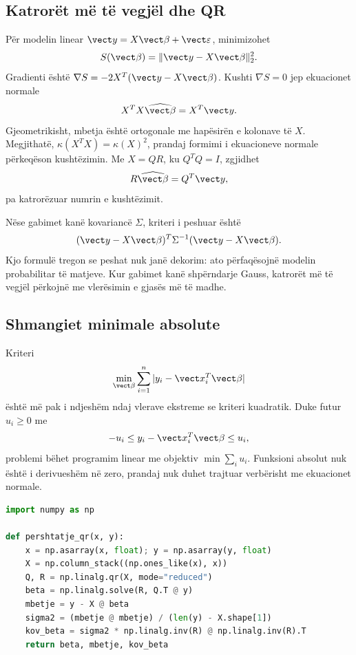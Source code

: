 \subsection{Katrorët më të vegjël dhe QR}
Për modelin linear $\vect y=X\vect\beta+\vect\varepsilon$, minimizohet
\begin{equation}
 S(\vect\beta)=\|\vect y-X\vect\beta\|_2^2.
\end{equation}
Gradienti është $\nabla S=-2X^T(\vect y-X\vect\beta)$. Kushti $\nabla S=0$ jep ekuacionet normale
\begin{equation}
 X^TX\widehat{\vect\beta}=X^T\vect y.
\end{equation}
Gjeometrikisht, mbetja është ortogonale me hapësirën e kolonave të $X$. Megjithatë, $\kappa(X^TX)=\kappa(X)^2$, prandaj formimi i ekuacioneve normale përkeqëson kushtëzimin. Me $X=QR$, ku $Q^TQ=I$, zgjidhet
\begin{equation}
 R\widehat{\vect\beta}=Q^T\vect y,
\end{equation}
pa katrorëzuar numrin e kushtëzimit.

Nëse gabimet kanë kovariancë $\Sigma$, kriteri i peshuar është
\begin{equation}
 (\vect y-X\vect\beta)^T\Sigma^{-1}(\vect y-X\vect\beta).
\end{equation}
Kjo formulë tregon se peshat nuk janë dekorim: ato përfaqësojnë modelin probabilitar të matjeve. Kur gabimet kanë shpërndarje Gauss, katrorët më të vegjël përkojnë me vlerësimin e gjasës më të madhe.

\subsection{Shmangiet minimale absolute}
Kriteri
\begin{equation}
 \min_{\vect\beta}\sum_{i=1}^{n}|y_i-\vect x_i^T\vect\beta|
\end{equation}
është më pak i ndjeshëm ndaj vlerave ekstreme se kriteri kuadratik. Duke futur $u_i\ge0$ me
\begin{equation}
 -u_i\le y_i-\vect x_i^T\vect\beta\le u_i,
\end{equation}
problemi bëhet programim linear me objektiv $\min\sum_i u_i$. Funksioni absolut nuk është i derivueshëm në zero, prandaj nuk duhet trajtuar verbërisht me ekuacionet normale.

\begin{lstlisting}[language=Python,caption={Përshtatje lineare me QR dhe diagnostikë të mbetjeve.}]
import numpy as np

def pershtatje_qr(x, y):
    x = np.asarray(x, float); y = np.asarray(y, float)
    X = np.column_stack((np.ones_like(x), x))
    Q, R = np.linalg.qr(X, mode="reduced")
    beta = np.linalg.solve(R, Q.T @ y)
    mbetje = y - X @ beta
    sigma2 = (mbetje @ mbetje) / (len(y) - X.shape[1])
    kov_beta = sigma2 * np.linalg.inv(R) @ np.linalg.inv(R).T
    return beta, mbetje, kov_beta
\end{lstlisting}

